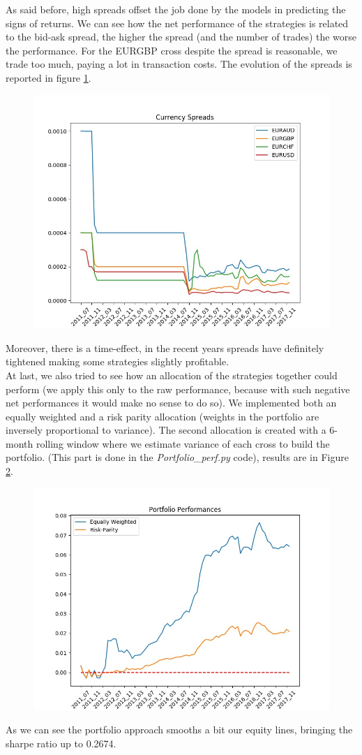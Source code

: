 \documentclass[a4paper]{article}
\begin{document}
As said before, high spreads offset the job done by the models in predicting the signs of returns. We can see how the net performance of the strategies is related to the bid-ask spread, the higher the spread (and the number of trades) the worse the performance. For the EURGBP cross despite the spread is reasonable, we trade too much, paying a lot in transaction costs. The evolution of the spreads is reported in figure \ref{fig:15}.
\begin{figure}[H]
\centering
\includegraphics[width=0.75\linewidth]{Figures/Spreads.jpeg}
\label{fig:15}
\end{figure}
Moreover, there is a time-effect, in the recent years spreads have definitely tightened making some strategies slightly profitable.\\
At last, we also tried to see how an allocation of the strategies together could perform (we apply this only to the raw performance, because with such negative net performances it would make no sense to do so). We implemented both an equally weighted and a risk parity allocation (weights in the portfolio are inversely proportional to variance). The second allocation is created with a 6-month rolling window where we estimate variance of each cross to build the portfolio. (This part is done in the \textit{Portfolio\_perf.py} code), results are in Figure \ref{fig:16}.
\begin{figure}[H]
\centering
\includegraphics[width=0.75\linewidth]{Figures/Portfolios.jpeg}
\label{fig:16}
\end{figure}
As we can see the portfolio approach smooths a bit our equity lines, bringing the sharpe ratio up to 0.2674.\\
\end{document}
